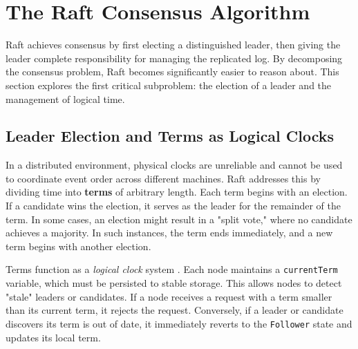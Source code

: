 \section{The Raft Consensus Algorithm}
Raft achieves consensus by first electing a distinguished leader, then giving the leader complete responsibility for managing the replicated log. By decomposing the consensus problem, Raft becomes significantly easier to reason about. This section explores the first critical subproblem: the election of a leader and the management of logical time.

\subsection{Leader Election and Terms as Logical Clocks}
In a distributed environment, physical clocks are unreliable and cannot be used to coordinate event order across different machines. Raft addresses this by dividing time into \textbf{terms} of arbitrary length.
Each term begins with an election. If a candidate wins the election, it serves as the leader for the remainder of the term. In some cases, an election might result in a "split vote," where no candidate achieves a majority. In such instances, the term ends immediately, and a new term begins with another election. 

Terms function as a \textit{logical clock} system \cite{Lamport1978}. Each node maintains a \texttt{currentTerm} variable, which must be persisted to stable storage. This allows nodes to detect "stale" leaders or candidates. If a node receives a request with a term smaller than its current term, it rejects the request. Conversely, if a leader or candidate discovers its term is out of date, it immediately reverts to the \texttt{Follower} state and updates its local term.

